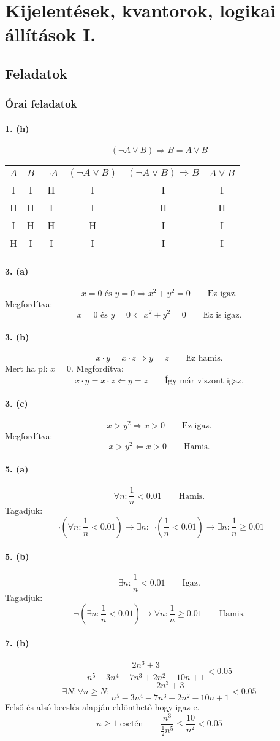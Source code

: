 \documentclass[12pt,a4paper,fleqn]{article}
\newcommand{\myparagraph}[1]{\paragraph{#1}\mbox{}}
\begin{document}
\clearpage
\section{Kijelentések, kvantorok, logikai állítások I.}
\setcounter{subsection}{1}
\subsection{Feladatok}
\subsubsection{Órai feladatok}


\myparagraph{1. (h)}
\[ (\neg A \lor B) \Rightarrow B = A \lor B \]
\begin{tabular}{c|c||c|c|c||c}
  $A$ & $B$ & $\neg A$ & $(\neg A \lor B)$ & $(\neg A \lor B) \Rightarrow B$ & $A \lor B$ \\
    \hline
  I & I & H & I & I & I \\ \hline
  H & H & I & I & H & H \\ \hline
  I & H & H & H & I & I \\ \hline
  H & I & I & I & I & I \\
\end{tabular}

\myparagraph{3. (a)}
\[ x = 0 \text{ és } y = 0 \Rightarrow x^2 + y^2 = 0 \qquad \text{Ez igaz.} \]
Megfordítva:
\[ x = 0 \text{ és } y = 0 \Leftarrow x^2 + y^2 = 0 \qquad \text{Ez is igaz.} \]

\myparagraph{3. (b)}
\[ x \cdot y = x \cdot z \Rightarrow y = z \qquad \text{Ez hamis.} \]
Mert ha pl: $x = 0$. Megfordítva:
\[ x \cdot y = x \cdot z \Leftarrow y = z \qquad \text{Így már viszont igaz.} \]

\myparagraph{3. (c)}
\[ x > y^2 \Rightarrow x > 0 \qquad \text{Ez igaz.} \]
Megfordítva:
\[ x > y^2 \Leftarrow x > 0 \qquad \text{Hamis.} \]

\myparagraph{5. (a)}
\[ \forall n : \frac{1}{n} < 0.01 \qquad \text{Hamis.} \]
Tagadjuk:
\[
  \neg(\forall n : \frac{1}{n} < 0.01)
  \rightarrow \exists n: \neg(\frac{1}{n} < 0.01)
  \rightarrow \exists n : \frac{1}{n} \geq 0.01
\]

\myparagraph{5. (b)}
\[ \exists n : \frac{1}{n} < 0.01 \qquad \text{Igaz.} \]
Tagadjuk:
\[ \neg (\exists n : \frac{1}{n} < 0.01) \rightarrow
  \forall n : \frac{1}{n} \geq 0.01 \qquad \text{Hamis.} \]

\myparagraph{7. (b)}
\[ \dfrac{2n^3+3}{n^5-3n^4-7n^3+2n^2-10n+1} < 0.05 \]
\[
  \exists N : \forall n \geq N : \dfrac{2n^3+3}{n^5-3n^4-7n^3+2n^2-10n+1} < 0.05
\]
Felső és alsó becslés alapján eldönthető hogy igaz-e.
\[ n \geq 1 \text{ esetén} \qquad \frac{n^3}{\frac{1}{2}n^5} \leq \frac{10}{n^2} < 0.05\]
\end{document}
